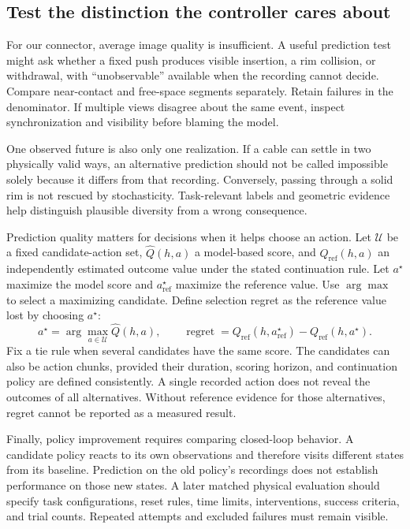 \subsection{Test the distinction the controller cares about}
For our connector, average image quality is insufficient. A useful prediction test might ask whether a fixed push produces visible insertion, a rim collision, or withdrawal, with ``unobservable'' available when the recording cannot decide. Compare near-contact and free-space segments separately. Retain failures in the denominator. If multiple views disagree about the same event, inspect synchronization and visibility before blaming the model.

One observed future is also only one realization. If a cable can settle in two physically valid ways, an alternative prediction should not be called impossible solely because it differs from that recording. Conversely, passing through a solid rim is not rescued by stochasticity. Task-relevant labels and geometric evidence help distinguish plausible diversity from a wrong consequence.

Prediction quality matters for decisions when it helps choose an action. Let $\mathcal U$ be a fixed candidate-action set, $\widehat Q(h,a)$ a model-based score, and $Q_{\mathrm{ref}}(h,a)$ an independently estimated outcome value under the stated continuation rule. Let $a^\star$ maximize the model score and $a_{\mathrm{ref}}^\star$ maximize the reference value. Use $\arg\max$ to select a maximizing candidate. Define selection regret as the reference value lost by choosing $a^\star$:
\begin{equation}
 a^\star=\arg\max_{a\in\mathcal U}\widehat Q(h,a),
 \qquad
 \operatorname{regret}=Q_{\mathrm{ref}}(h,a_{\mathrm{ref}}^\star)
                     -Q_{\mathrm{ref}}(h,a^\star).
 \label{eq:middle-regret}
\end{equation}
Fix a tie rule when several candidates have the same score. The candidates can also be action chunks, provided their duration, scoring horizon, and continuation policy are defined consistently. A single recorded action does not reveal the outcomes of all alternatives. Without reference evidence for those alternatives, regret cannot be reported as a measured result.

Finally, policy improvement requires comparing closed-loop behavior. A candidate policy reacts to its own observations and therefore visits different states from its baseline. Prediction on the old policy's recordings does not establish performance on those new states. A later matched physical evaluation should specify task configurations, reset rules, time limits, interventions, success criteria, and trial counts. Repeated attempts and excluded failures must remain visible.

